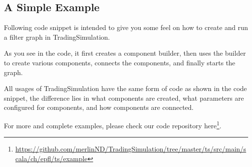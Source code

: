 \subsection{A Simple Example}

Following code snippet is intended to give you some feel on how to create and run a filter graph in TradingSimulation.



As you see in the code, it first creates a component builder, then uses the builder to create various  components, connects the components, and finally starts the graph.

All usages of TradingSimulation have the same form of code as shown in the code snippet, the difference lies in what components are created, what parameters are configured for components, and how components are connected.

For more and complete examples, please check our code repository here\footnote{\url{https://github.com/merlinND/TradingSimulation/tree/master/ts/src/main/scala/ch/epfl/ts/example}}.
